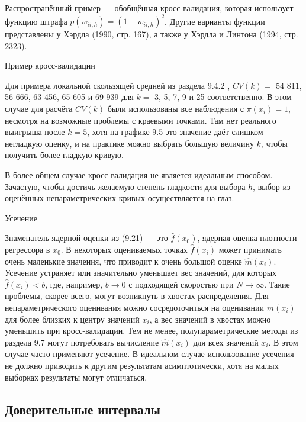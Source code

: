 Распространённый пример --- обобщённая кросс-валидация, которая использует функцию штрафа $p(w_{ii,h}) = (1 - w_{ii,h})^2$. Другие варианты функции представлены у Хэрдла (1990, стр. 167), а также у Хэрдла и Линтона (1994, стр. 2323).

\begin{center}
Пример кросс-валидации
\end{center}

Для примера локальной скользящей средней из раздела 9.4.2 , $CV(k) =$ 54 811, 56 666, 63 456, 65 605 и 69 939 для $k = $ 3, 5, 7, 9 и 25 соответственно. В этом случае для расчёта $CV(k)$ были использованы все наблюдения с $\pi(x_i) = 1$, несмотря на возможные проблемы с краевыми точками. Там нет  реального выигрыша после $k = 5$, хотя на графике 9.5 это значение даёт слишком негладкую оценку, и на практике можно выбрать большую величину $k$, чтобы получить более гладкую кривую.

В более общем случае кросс-валидация не является идеальным способом. Зачастую, чтобы достичь желаемую степень гладкости для выбора $h$, выбор из оценённых непараметрических кривых осуществляется на глаз.

\begin{center}
Усечение
\end{center}

Знаменатель ядерной оценки из (9.21) --- это $\hat{f}(x_0)$, ядерная оценка плотности регрессора в $x_0$. В некоторых оцениваемых точках $\hat{f}(x_i)$ может принимать очень маленькие значения, что приводит к очень большой оценке $\hat{m}(x_i)$. Усечение устраняет или значительно уменьшает вес значений, для которых $\hat{f}(x_i) < b$, где, например, $b \rightarrow 0$ с подходящей скоростью при $N \rightarrow \infty$. Такие проблемы, скорее всего, могут возникнуть в хвостах распределения. Для непараметрического оценивания можно сосредоточиться на оценивании $m(x_i)$ для более близких к центру значений $x_i$, а вес значений в хвостах можно уменьшить при кросс-валидации. Тем не менее, полупараметрические методы из раздела 9.7 могут потребовать вычисление $\hat{m}(x_i)$ для всех значений $x_i$. В этом случае часто применяют усечение. В идеальном случае использование усечения не должно приводить к другим результатам асимптотически, хотя на малых выборках результаты могут отличаться.

\subsection{Доверительные интервалы}

